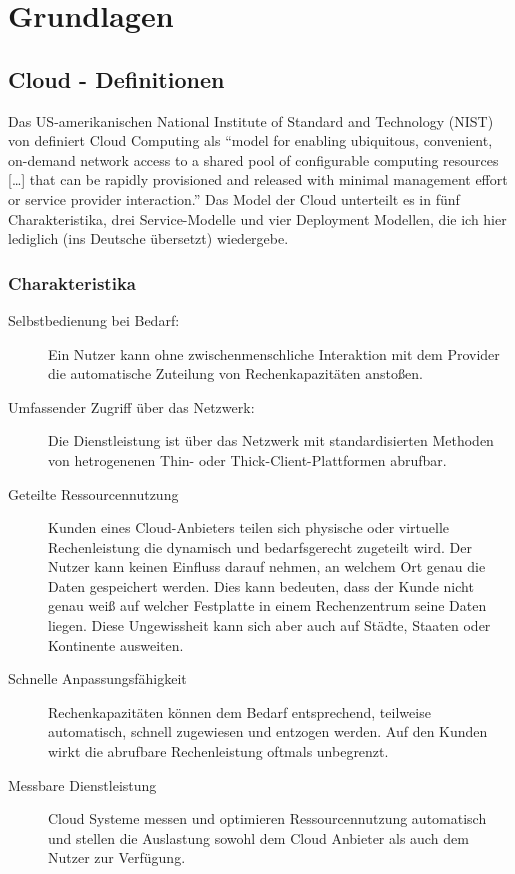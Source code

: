 \section{Grundlagen}

\subsection{Cloud \-- Definitionen}
Das US-amerikanischen National Institute of Standard and 
Technology (NIST) von  definiert Cloud Computing als 
"`model for enabling ubiquitous, convenient, on-demand 
network access to a shared
pool of configurable computing resources [\dots] that
can be rapidly provisioned and released with minimal management effort or 
service provider interaction."' Das Model der Cloud unterteilt es in fünf 
Charakteristika, drei Service-Modelle und vier Deployment Modellen, die ich 
hier lediglich (ins Deutsche übersetzt) wiedergebe.
\subsubsection{Charakteristika}
\begin{description}
	\item[Selbstbedienung bei Bedarf:] Ein Nutzer kann ohne 
zwischenmenschliche Interaktion mit dem Provider die automatische Zuteilung von 
Rechenkapazitäten anstoßen.
	\item[Umfassender Zugriff über das Netzwerk:] Die Dienstleistung ist 
über das Netzwerk mit standardisierten Methoden von hetrogenenen Thin- oder 
Thick-Client-Plattformen abrufbar.
	\item[Geteilte Ressourcennutzung] Kunden eines Cloud-Anbieters teilen 
sich physische oder virtuelle Rechenleistung die dynamisch und bedarfsgerecht 
zugeteilt wird. Der Nutzer kann keinen Einfluss darauf nehmen, an welchem Ort 
genau die Daten gespeichert werden. Dies kann bedeuten, dass der Kunde nicht 
genau weiß auf welcher Festplatte in einem Rechenzentrum seine Daten liegen. 
Diese Ungewissheit kann sich aber auch auf Städte, Staaten oder Kontinente 
ausweiten.
	\item[Schnelle Anpassungsfähigkeit] Rechenkapazitäten können dem Bedarf 
entsprechend, teilweise automatisch, schnell zugewiesen und entzogen werden. 
Auf den Kunden wirkt die abrufbare Rechenleistung oftmals unbegrenzt.
	\item[Messbare Dienstleistung] Cloud Systeme messen und optimieren 
Ressourcennutzung automatisch und stellen die Auslastung sowohl dem Cloud 
Anbieter als auch dem Nutzer zur Verfügung.
\end{description}
